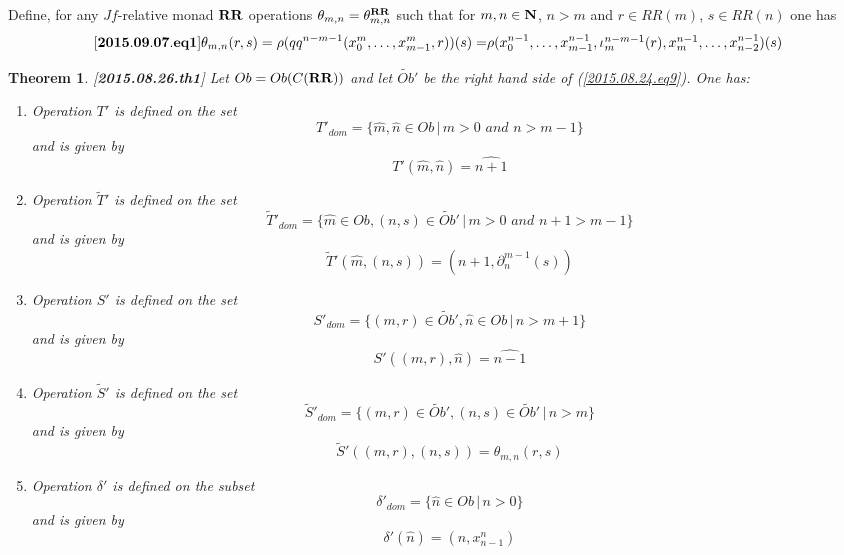 \documentclass[11pt]{article}
\newenvironment{eq}{\begin{equation}}{\end{equation}}
\newtheorem{theorem}[proposition]{Theorem}
\newcommand{\llabel}[1]{\label{#1}[{\bf #1}]}
\newcommand{\nn}{{\bf N\rm}}
\newcommand{\nat}{\nn}
\newcommand{\wt}{\widetilde}
\newcommand{\wh}{\widehat}
\newcommand{\mbind}{\rho}
\newcommand{\RR}{{\bf RR}}
\begin{document}
Define, for any $Jf$-relative monad $\RR$ operations $\theta_{m,n}=\theta^{\RR}_{m,n}$ such that for $m,n\in\nat$, $n>m$ and $r\in RR(m)$, $s\in RR(n)$ one has
%
\begin{eq}
\llabel{2015.09.07.eq1}
\theta_{m,n}(r,s)=\mbind(qq^{n-m-1}(x_0^m,\dots,x_{m-1}^m,r))(s)=$$
$$\mbind(x_0^{n-1},\dots,x_{m-1}^{n-1},\iota_{m}^{n-m-1}(r),x_m^{n-1},\dots,x_{n-2}^{n-1})(s)
\end{eq}
%
\begin{theorem}
\llabel{2015.08.26.th1}
Let $Ob=Ob(C(\RR))$ and let $\wt{Ob}'$ be the right hand side of (\ref{2015.08.24.eq9}). One has:
%
\begin{enumerate}
\item Operation $T'$ is defined on the set
%
$$T'_{dom}=\{\wh{m},\wh{n}\in Ob\,|\,m>0\,\,and\,\,n>m-1\}$$
%
and is given by 
%
$$T'(\wh{m},\wh{n})=\wh{n+1}$$
%
\item Operation $\wt{T}'$ is defined on the set 
%
$$\wt{T}'_{dom}=\{\wh{m}\in Ob, (n,s)\in \wt{Ob}'\,|\,m>0\,\,and\,\,n+1>m-1\}$$
%
and is given by
%
$$\wt{T}'(\wh{m},(n,s))=(n+1,\partial_n^{m-1}(s))$$
%
\item Operation $S'$ is defined on the set
%
$$S'_{dom}=\{(m,r)\in \wt{Ob}',\wh{n}\in Ob\,|\,n>m+1\}$$
%
and is given by
%
$$S'((m,r),\wh{n})=\wh{n-1}$$
%
\item Operation $\wt{S}'$ is defined on the set 
%
$$\wt{S}'_{dom}=\{(m,r)\in\wt{Ob}',(n,s)\in \wt{Ob}'\,|\,n>m\}$$
%
and is given by
%
$$\wt{S}'((m,r),(n,s))=\theta_{m,n}(r,s)$$
%
\item Operation $\delta'$ is defined on the subset
%
$$\delta'_{dom}=\{\wh{n}\in Ob\,|\,n>0\}$$
%
and is given by
%
$$\delta'(\wh{n})=(n,x_{n-1}^n)$$
%
\end{enumerate}
\end{theorem}
%
\end{document}
